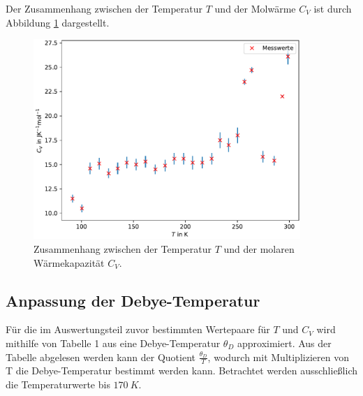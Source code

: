 \clearpage
Der Zusammenhang zwischen der Temperatur $T$ und der Molwärme $C_V$ ist durch Abbildung \ref{fig:cvplot} dargestellt.
\begin{figure}[H]
  \centering
  \includegraphics[width=0.9\textwidth]{plots/cvplot.pdf}
  \caption{Zusammenhang zwischen der Temperatur $T$ und der molaren Wärmekapazität $C_V$.}
  \label{fig:cvplot}
\end{figure}
\clearpage
\subsection{Anpassung der Debye-Temperatur}
Für die im Auswertungsteil zuvor bestimmten Wertepaare für $T$ und $C_V$ wird mithilfe von Tabelle 1 aus \cite{anleitung} eine Debye-Temperatur $\theta_D$ approximiert.
Aus der Tabelle abgelesen werden kann der Quotient $\frac{\theta_D}{T}$, wodurch mit Multiplizieren von T die Debye-Temperatur bestimmt werden kann.
Betrachtet werden ausschließlich die Temperaturwerte bis $\SI{170}{K}$.

